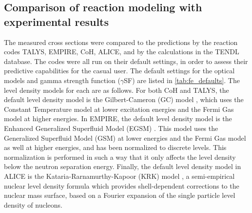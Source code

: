 \subsection{Comparison of reaction modeling with experimental results}


% 

The measured cross sections were compared to the predictions by the reaction codes TALYS, EMPIRE, CoH, ALICE, and by the calculations in the TENDL database.
The codes were all run on their default settings, in order to assess their predictive capabilities for the casual user.
The default settings for the optical models and gamma strength function ($\gamma$SF) are listed in  \autoref{tab:fe_defaults}.
The level density models for each are as follows.
For both CoH and TALYS, the default level density model is the Gilbert-Cameron (GC) model \cite{Gilbert2011}, which uses the Constant Temperature model at lower excitation energies and the Fermi Gas model at higher energies.
In EMPIRE, the default level density model is the Enhanced Generalized Superfluid Model (EGSM) \cite{Giardina2002}.
This model uses the Generalized Superfluid Model (GSM) \cite{ignatyuk1979role,Ignatyuk1993} at lower energies and the Fermi Gas model as well at higher energies, and has been normalized to discrete levels.
This normalization is performed in such a way that it only affects the level density below the neutron separation energy.
Finally, the default level density model in ALICE is the Kataria-Rarnamurthy-Kapoor (KRK) model \cite{Kataria1978,Kataria1990}, a semi-empirical nuclear level density formula which provides shell-dependent corrections to the nuclear mass surface, based on a Fourier expansion of the single particle level density of nucleons.


